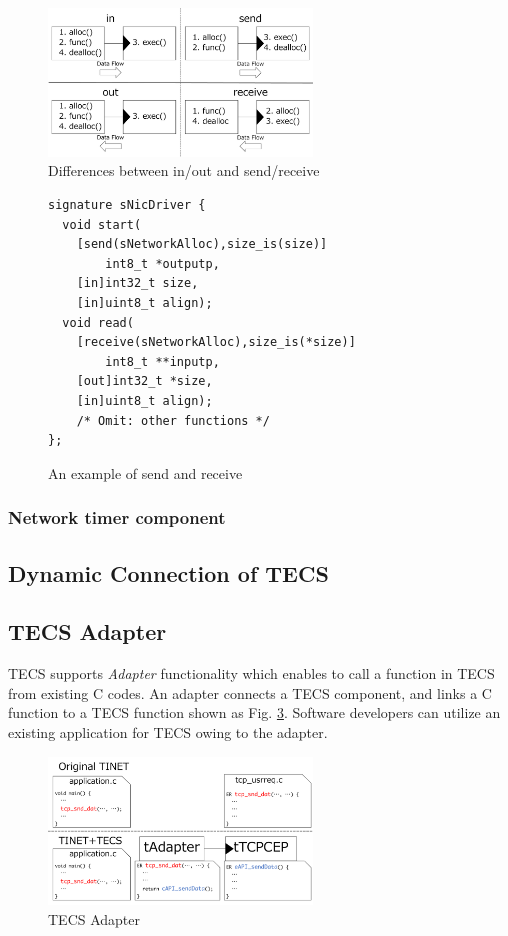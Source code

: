 \documentclass[conference]{IEEEtran/IEEEtran}
\begin{document}
\begin{figure}[t]
    \centering
    \includegraphics[width=7.0cm,clip]{figure/SendReceive.pdf}
    \caption{Differences between in/out and send/receive}
    \label{fig:SendReceive}
\end{figure}

\begin{figure}[t]
\centering
\begin{lstlisting}
signature sNicDriver {
  void start(
    [send(sNetworkAlloc),size_is(size)]
        int8_t *outputp,
    [in]int32_t size,
    [in]uint8_t align);
  void read(
    [receive(sNetworkAlloc),size_is(*size)]
        int8_t **inputp,
    [out]int32_t *size,
    [in]uint8_t align);
    /* Omit: other functions */
};
\end{lstlisting}
\caption{An example of send and receive}
\label{src:SendReceive}
\end{figure}

\subsubsection{Network timer component}


\subsection{Dynamic Connection of TECS}

\subsection{TECS Adapter}
\label{sec:TECS Adapter}

TECS supports {\it Adapter} functionality which enables to call a function in TECS from existing C codes.
An adapter connects a TECS component, and links a C function to a TECS function shown as Fig. \ref{fig:TECS_Adapter}.
Software developers can utilize an existing application for TECS owing to the adapter.

\begin{figure}[t]
    \centering
    \includegraphics[width=7.0cm,clip]{figure/TECS_Adapter.pdf}
    \caption{TECS Adapter}
    \label{fig:TECS_Adapter}
\end{figure}
\end{document}
